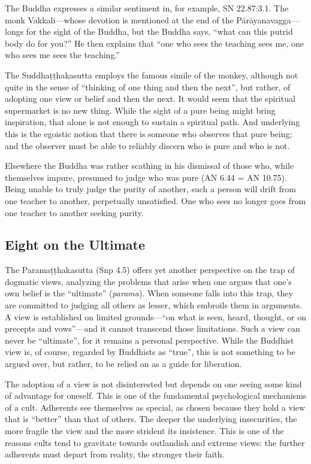 \documentclass[12pt,openany]{book}%
\begin{document}
The Buddha expresses a similar sentiment in, for example, SN 22.87:3.1. The monk Vakkali—whose devotion is mentioned at the end of the \textsanskrit{Pārāyanavagga}—longs for the sight of the Buddha, but the Buddha says, “what can this putrid body do for you?” He then explains that “one who sees the teaching sees me, one who sees me sees the teaching.”

The \textsanskrit{Suddhaṭṭhakasutta} employs the famous simile of the monkey, although not quite in the sense of “thinking of one thing and then the next”, but rather, of adopting one view or belief and then the next. It would seem that the spiritual supermarket is no new thing. While the sight of a pure being might bring inspiration, that alone is not enough to sustain a spiritual path. And underlying this is the egoistic notion that there is someone who observes that pure being; and the observer must be able to reliably discern who is pure and who is not.

Elsewhere the Buddha was rather scathing in his dismissal of those who, while themselves impure, presumed to judge who was pure (AN 6.44 = AN 10.75). Being unable to truly judge the purity of another, such a person will drift from one teacher to another, perpetually unsatisfied. One who sees no longer goes from one teacher to another seeking purity.

\subsection*{Eight on the Ultimate}

The \textsanskrit{Paramaṭṭhakasutta} (Snp 4.5) offers yet another perspective on the trap of dogmatic views, analyzing the problems that arise when one argues that one’s own belief is the “ultimate” (\textit{parama}). When someone falls into this trap, they are committed to judging all others as lesser, which embroils them in arguments. A view is established on limited grounds—“on what is seen, heard, thought, or on precepts and vows”—and it cannot transcend those limitations. Such a view can never be “ultimate”, for it remains a personal perspective. While the Buddhist view is, of course, regarded by Buddhists as “true”, this is not something to be argued over, but rather, to be relied on as a guide for liberation.

The adoption of a view is not disinterested but depends on one seeing some kind of advantage for oneself. This is one of the fundamental psychological mechanisms of a cult. Adherents see themselves as special, as chosen because they hold a view that is “better” than that of others. The deeper the underlying insecurities, the more fragile the view and the more strident its insistence. This is one of the reasons cults tend to gravitate towards outlandish and extreme views: the further adherents must depart from reality, the stronger their faith.
\end{document}
